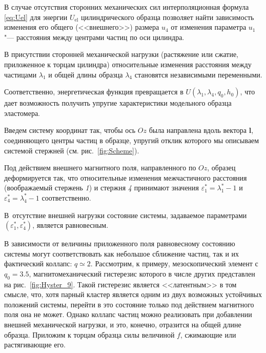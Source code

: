 


\smallskip




В случае отсутствия сторонних механических сил интерполяционная формула \eqref{eq:Uel} для энергии $U_{\text{el}}$ цилиндрического образца позволяет найти зависимость изменения его общего (<<внешнего>>) размера $u_4$ от изменения параметра $u_1$ "--- расстояния между центрами частиц по оси цилиндра.



В присутствии сторонней механической нагрузки (растяжение или сжатие, приложенное к торцам цилиндра) относительные изменения расстояния между частицами $\lambda_1$ и общей длины образца $\lambda_4$ становятся независимыми переменными. 

Соответственно, энергетическая функция  превращается в  $U(\lambda_1,\lambda_4,q_0,h_0)$, что дает возможность получить упругие характеристики модельного образца эластомера.



Введем систему координат так, чтобы ось $Oz$ была направлена вдоль вектора $\boldsymbol l$, соединяющего центры частиц в образце, упругий отклик которого мы описываем системой стержней (см. рис.~\ref{fig:Scheme}). 

Под действием внешнего магнитного поля, направленного по $Oz$, образец деформируется так, что относительные изменения межчастичного расстояния (воображаемый стержень {\sl 1}) и стержня {\sl 4} принимают значения $\varepsilon_1^*=\lambda_1^*-1$ и $\varepsilon_4^*=\lambda_4^*-1$ соответственно. 

В~отсутствие внешней нагрузки состояние системы, задаваемое параметрами $(\varepsilon_1^*,\varepsilon_4^*)$, является равновесным.



В зависимости от величины приложенного поля равновесному состоянию системы могут соответствовать как небольшое сближение частиц, так и их фактический коллапс: $q\simeq2$. Рассмотрим, к примеру, мезоскопический элемент с $q_0=3.5$, магнитомеханический гистерезис которого в числе других представлен на рис.~\ref{fig:Hyster_9}. Такой гистерезис является <<латентным>> \cite{PRE_15} в том смысле, что, хотя парный кластер является одним из двух возможных устойчивых положений системы, перейти в это состояние только под действием магнитного поля она не может. Однако коллапс частиц можно реализовать при добавлении внешней механической нагрузки, и это, конечно, отразится на общей длине образца. Приложим к торцам образца силы величиной $f$, сжимающие или растягивающие его. 

